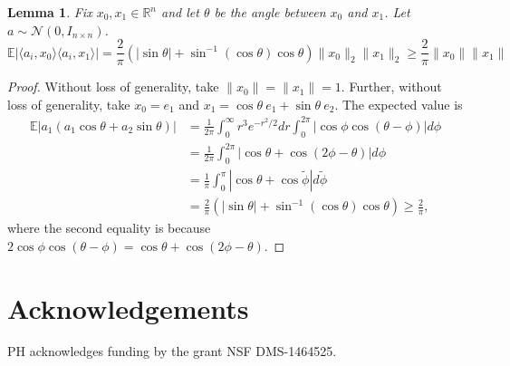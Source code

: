 \documentclass[12pt]{article}
\newcommand{\1}{\mathbf{1}}
\newtheorem{lemma}[theorem]{Lemma}
\begin{document}
\begin{lemma}  \label{lemma:expectation}
Fix $x_0, x_1 \in \mathbb{R}^n$ and let $\theta$ be the angle between $x_0$ and $x_1$.  Let $a \sim \mathcal{N}(0, I_{n \times n})$.  $$\mathbb{E}|\langle a_i, x_0\rangle \langle a_i, x_1 \rangle | = \frac{2}{\pi} \left(|\sin \theta| + \sin^{-1} (\cos \theta) \cos \theta \right) \|x_0\|_2 \|x_1\|_2 \geq \frac{2}{\pi} \|x_0\| \|x_1\|$$
\end{lemma}
\begin{proof}
Without loss of generality, take $\|x_0\|=\|x_1\| = 1$.  Further, without loss of generality, take $x_0 = e_1$ and $x_1 = \cos \theta \ e_1 + \sin \theta \ e_2$.  The expected value is 
\begin{align*}
\mathbb{E} |a_1 (a_1 \cos \theta + a_2 \sin \theta) | &= \frac{1}{2 \pi} \int_0^\infty r^3 e^{-r^2/2} dr \int_0^{2\pi} |\cos \phi \cos(\theta - \phi)| d\phi \\
&=\frac{1}{2\pi} \int_0^{2\pi}|\cos \theta + \cos(2 \phi - \theta)| d\phi\\
&=\frac{1}{\pi} \int_0^\pi |\cos \theta + \cos \tilde{\phi}| d\tilde{\phi}\\
&=\frac{2}{\pi}  \left(|\sin \theta| + \sin^{-1} (\cos \theta) \cos \theta \right) \geq \frac{2}{\pi},
\end{align*}
where the second equality is because $2 \cos \phi \cos(\theta - \phi) = \cos \theta + \cos(2 \phi - \theta)$. 
\end{proof}

\section{Acknowledgements}
PH acknowledges funding by the grant NSF DMS-1464525. 


\end{document}
